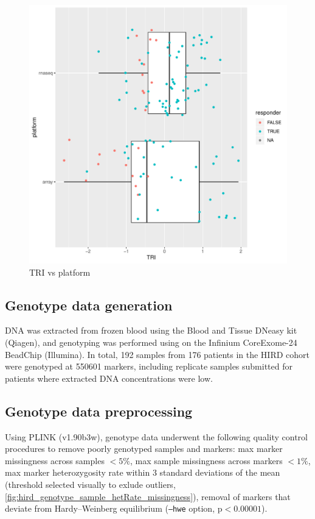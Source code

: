 \begin{figure}
    \includegraphics[width=1.0\textwidth,page=1]{mainmatter/figures/chapter_02/compare_phenotype_by_platform.pheno_boxplots.pdf}
    \caption{TRI vs platform}
    \label{fig:hird_phenotypes_by_platform}
\end{figure}

\subsection{Genotype data generation}

DNA was extracted from frozen blood using the Blood and Tissue DNeasy kit (Qiagen), and genotyping was performed using on the Infinium CoreExome-24 BeadChip (Illumina).
In total, 192 samples from 176 patients in the HIRD cohort were genotyped at 550601 markers, including replicate samples submitted for patients where extracted DNA concentrations were low.

\subsection{Genotype data preprocessing}

Using PLINK (v1.90b3w), genotype data underwent the following quality control procedures to remove poorly genotyped samples and markers:
max marker missingness across samples $< 5\%$, 
max sample missingness across markers $< 1\%$, 
max marker heterozygosity rate within 3 standard deviations of the mean (threshold selected visually to exlude outliers, \autoref{fig:hird_genotype_sample_hetRate_missingness}),
removal of markers that deviate from Hardy–Weinberg equilibrium (\texttt{--hwe} option, $\text{p} < 0.00001$).

